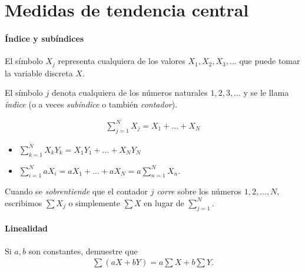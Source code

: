 \section{Medidas de tendencia central}

\paragraph{\'Indice y subíndices}
El símbolo $X_{j}$ representa cualquiera de los  valores $X_{1},X_{2},X_{3},...$ que puede tomar la variable discreta $X.$


El símbolo $j$ denota cualquiera de los números naturales $1,2,3,...$ y se le llama \emph{índice} (o a veces \emph{subíndice} o también \emph{contador}).




\begin{definicion}[Sumatoria]
	\begin{align}
		\sum_{j=1}^{N}X_{j}=X_{1}+...+X_{N}
	\end{align}
\end{definicion}



\begin{ejemplo}
	\begin{itemize}
		\item $\displaystyle \sum_{k=1}^{N}X_{k}Y_{k}=
		X_{1}Y_{1}+...+X_{N}Y_{N}$
		\item $\displaystyle \sum_{i=1}^{N} aX_{i}=
		aX_{1}+...+aX_{N}=a\sum_{n=1}^{N}X_{n}.$
	\end{itemize}
	
\end{ejemplo}



\begin{observacion}
	Cuando se \emph{sobrentiende} que el contador $j$ \emph{corre} sobre los números $1,2,...,N,$ escribimos $\sum X_{j}$ o simplemente $\sum X$ en lugar de $\sum_{j=1}^{N}.$
\end{observacion}


\paragraph{Linealidad}
\begin{problema}
	Si $a,b$ son constantes, demuestre que
	\begin{align}
		\sum \left( aX+bY \right)=a\sum X + b\sum Y.
	\end{align}
\end{problema}

